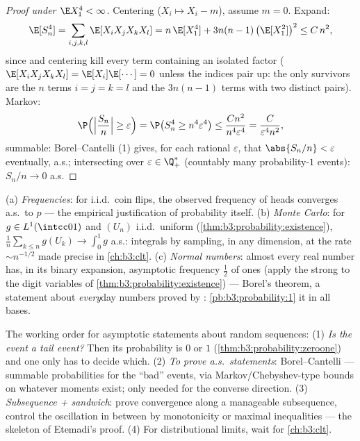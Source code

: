 \begin{proof}[Proof under $\E X_1^4 < \infty$]
Centering ($X_i \mapsto X_i - m$), assume $m = 0$. Expand:
\[
\E[S_n^4] = \sum_{i,j,k,l}\E[X_iX_jX_kX_l]
= n\,\E[X_1^4] + 3n(n-1)\,\bigl(\E[X_1^2]\bigr)^2 \leq
C\,n^2 ,
\]
since  and centering kill every term containing
an isolated factor ($\E[X_iX_jX_kX_l] =
\E[X_i]\E[\cdots] = 0$ unless the indices pair up: the only
survivors are the $n$ terms $i=j=k=l$ and the $3n(n-1)$
terms with two distinct pairs). Markov:
\[
\P\Bigl(\Bigl|\frac{S_n}n\Bigr| \geq \varepsilon\Bigr)
= \P\bigl(S_n^4 \geq n^4\varepsilon^4\bigr)
\leq \frac{Cn^2}{n^4\varepsilon^4} =
\frac{C}{\varepsilon^4n^2},
\]
summable: Borel--Cantelli (1) gives, for each rational
$\varepsilon$, that $\abs{S_n/n} < \varepsilon$ eventually,
a.s.; intersecting over $\varepsilon \in \Q_+^*$ (countably
many probability-$1$ events): $S_n/n \to 0$ a.s.
\end{proof}

\begin{example}
\label{ex:b3:probability:sllnapps}
(a) \emph{Frequencies}: for i.i.d.\ coin flips, the observed
frequency of heads converges a.s.\ to $p$ --- the empirical
justification of probability itself.
(b) \emph{Monte Carlo}: for $g \in
L^1(\intcc01)$ and $(U_n)$ i.i.d.\ uniform
(\cref{thm:b3:probability:existence}),
$\frac1n\sum_{k\leq n}g(U_k) \to \int_0^1g$ a.s.: integrals
by sampling, in any dimension, at the 
rate $\sim n^{-1/2}$ made precise in \cref{ch:b3:clt}.
(c) \emph{Normal numbers}: almost every real number has, in
its binary expansion, asymptotic frequency $\frac12$ of ones
(apply the strong  to the digit variables of
\cref{thm:b3:probability:existence}) --- Borel's theorem, a
statement about \emph{every}day numbers proved by :
\cref{pb:b3:probability:1}  it in all bases.
\end{example}

\begin{method}\label{met:b3:probability:toolkit}
The working order for asymptotic statements about random
sequences: (1) \emph{Is the event a tail event?} Then its
probability is $0$ or $1$
(\cref{thm:b3:probability:zeroone}) and one only has to
decide which. (2) \emph{To prove a.s.\ statements}:
Borel--Cantelli --- summable probabilities for the
``bad'' events, via Markov/Chebyshev-type bounds on
whatever moments exist;  only needed for the
converse direction. (3) \emph{Subsequence + sandwich}: prove
convergence along a manageable subsequence, control the
oscillation in between by monotonicity or maximal
inequalities --- the skeleton of Etemadi's proof. (4) For
distributional limits, wait for \cref{ch:b3:clt}.
\end{method}


